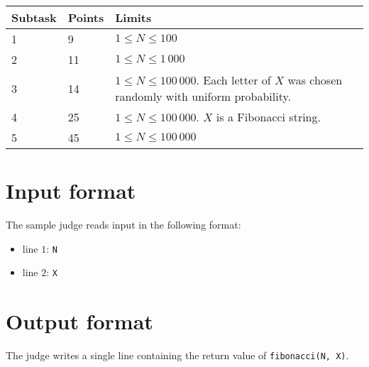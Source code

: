 \begin{tabular}{|l|l|l|}
  \hline
  \textbf{Subtask} & \textbf{Points} & \textbf{Limits} \\ \hline
  1 & 9 & $1 \le N \le 100$  \\ \hline
  2 & 11 & $1 \le N \le 1\,000$  \\ \hline
  3 & 14 & $1 \le N \le 100\,000$. Each letter of $X$ was chosen randomly with uniform probability.  \\ \hline
  4 & 25 & $1 \le N \le 100\,000$. $X$ is a Fibonacci string.  \\ \hline
  5 & 45 & $1 \le N \le 100\,000$  \\ \hline

\end{tabular}

\section*{Input format}
The sample judge reads input in the following format:

\begin{itemize}
  \item line $1$: \texttt{N}
  \item line $2$: \texttt{X}
\end{itemize}

\section*{Output format}
The judge writes a single line containing the return value of \texttt{fibonacci(N, X)}.
